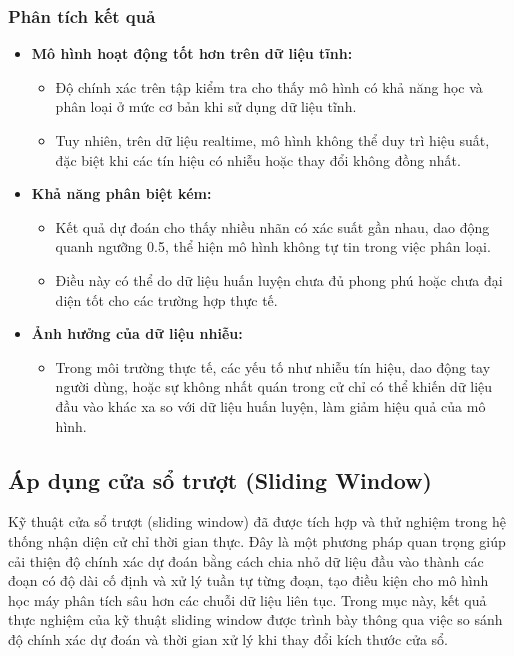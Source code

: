 \subsubsection{Phân tích kết quả}
\begin{itemize}
    \item \textbf{Mô hình hoạt động tốt hơn trên dữ liệu tĩnh:}
    \begin{itemize}
        \item Độ chính xác trên tập kiểm tra cho thấy mô hình có khả năng học và phân loại ở mức cơ bản khi sử dụng dữ liệu tĩnh.
        \item Tuy nhiên, trên dữ liệu realtime, mô hình không thể duy trì hiệu suất, đặc biệt khi các tín hiệu có nhiễu hoặc thay đổi không đồng nhất.
    \end{itemize}

    \item \textbf{Khả năng phân biệt kém:}
    \begin{itemize}
        \item Kết quả dự đoán cho thấy nhiều nhãn có xác suất gần nhau, dao động quanh ngưỡng 0.5, thể hiện mô hình không tự tin trong việc phân loại.
        \item Điều này có thể do dữ liệu huấn luyện chưa đủ phong phú hoặc chưa đại diện tốt cho các trường hợp thực tế.
    \end{itemize}

    \item \textbf{Ảnh hưởng của dữ liệu nhiễu:}
    \begin{itemize}
        \item Trong môi trường thực tế, các yếu tố như nhiễu tín hiệu, dao động tay người dùng, hoặc sự không nhất quán trong cử chỉ có thể khiến dữ liệu đầu vào khác xa so với dữ liệu huấn luyện, làm giảm hiệu quả của mô hình.
    \end{itemize}
\end{itemize}

\subsection{Áp dụng cửa sổ trượt (Sliding Window)}

Kỹ thuật cửa sổ trượt (sliding window) đã được tích hợp và thử nghiệm trong hệ thống nhận diện cử chỉ thời gian thực. Đây là một phương pháp quan trọng giúp cải thiện độ chính xác dự đoán bằng cách chia nhỏ dữ liệu đầu vào thành các đoạn có độ dài cố định và xử lý tuần tự từng đoạn, tạo điều kiện cho mô hình học máy phân tích sâu hơn các chuỗi dữ liệu liên tục. Trong mục này, kết quả thực nghiệm của kỹ thuật sliding window được trình bày thông qua việc so sánh độ chính xác dự đoán và thời gian xử lý khi thay đổi kích thước cửa sổ.

